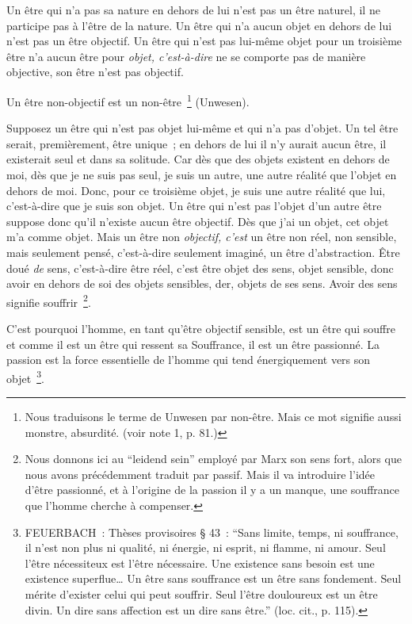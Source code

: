 \documentclass[french,twoside]{book} %
\begin{document}
Un être qui n’a pas sa nature en dehors de lui n’est pas un être naturel, il ne participe pas à l’être de la nature. Un être qui n’a aucun objet en dehors de lui n’est pas un être objectif. Un être qui n’est pas lui-même objet pour un troisième être n’a aucun être pour \emph{objet, c’est-à-dire} ne se comporte pas de manière objective, son être n’est pas objectif.\par
[XXVII] Un être non-objectif est un non-être \footnote{Nous traduisons le terme de Unwesen par non-être. Mais ce mot signifie aussi monstre, absurdité. (voir note 1, p. 81.)} (Unwesen).\par
Supposez un être qui n’est pas objet lui-même et qui n’a pas d’objet. Un tel être serait, premièrement, être unique ; en dehors de lui il n’y aurait aucun être, il existerait seul et dans sa solitude. Car dès que des objets existent en dehors de moi, dès que je ne suis pas seul, je suis un autre, une autre réalité que l’objet en dehors de moi. Donc, pour ce troisième objet, je suis une autre réalité que lui, c’est-à-dire que je suis son objet. Un être qui n’est pas l’objet d’un autre être suppose donc qu’il n’existe aucun être objectif. Dès que j’ai un objet, cet objet m’a comme objet. Mais un être non \emph{objectif, c’est} un être non réel, non sensible, mais seulement pensé, c’est-à-dire seulement imaginé, un être d’abstraction. Être doué \emph{de} sens, c’est-à-dire être réel, c’est être objet des sens, objet sensible, donc avoir en dehors de soi des objets sensibles, der, objets de ses sens. Avoir des sens signifie souffrir \footnote{Nous donnons ici au “leidend sein” employé par Marx son sens fort, alors que nous avons précédemment traduit par passif. Mais il va introduire l’idée d’être passionné, et à l’origine de la passion il y a un manque, une souffrance que l’homme cherche à compenser.}.\par
C’est pourquoi l’homme, en tant qu’être objectif sensible, est un être qui souffre et comme il est un être qui ressent sa Souffrance, il est un être passionné. La passion est la force essentielle de l’homme qui tend énergiquement vers son objet \footnote{FEUERBACH : Thèses provisoires § 43 : “Sans limite, temps, ni souffrance, il n’est non plus ni qualité, ni énergie, ni esprit, ni flamme, ni amour. Seul l’être nécessiteux est l’être nécessaire. Une existence sans besoin est une existence superflue… Un être sans souffrance est un être sans fondement. Seul mérite d’exister celui qui peut souffrir. Seul l’être douloureux est un être divin. Un dire sans affection est un dire sans être.” (loc. cit., p. 115).}.\par
\end{document}
